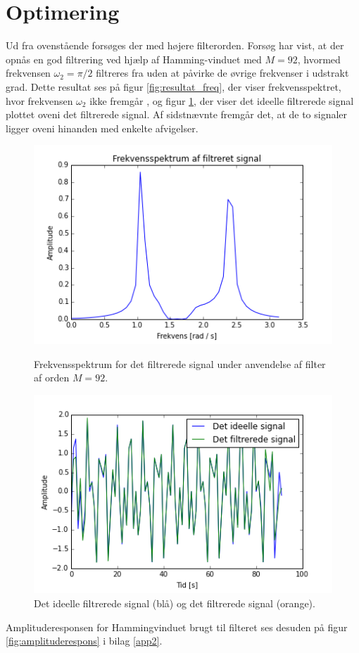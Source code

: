 \section{Optimering}
Ud fra ovenstående forsøges der med højere filterorden. Forsøg har vist, at der opnås en god filtrering ved hjælp af Hamming-vinduet med $M=92$, hvormed frekvensen $\omega_2 = \pi/2$ filtreres fra uden at påvirke de øvrige frekvenser i udstrakt grad. Dette resultat ses på figur \ref{fig:resultat_freq}, der viser frekvensspektret, hvor frekvensen $\omega_2$ ikke fremgår , og figur \ref{fig:resultat_signal}, der viser det ideelle filtrerede signal plottet oveni det filtrerede signal. Af sidstnævnte fremgår det, at de to signaler ligger oveni hinanden med enkelte afvigelser.
\begin{figure}[H]
\begin{minipage}{0.49\textwidth}
\centering
\includegraphics[width=\textwidth]{figures/Filter/freq_filt_signal.png}
\caption{Frekvensspektrum for det filtrerede signal under anvendelse af filter af orden $M=92$.}
\label{fig:resultat_freq}
\end{minipage}
\begin{minipage}{0.49\textwidth}
\centering
\includegraphics[width=\textwidth]{figures/Filter/signal_compare.png}
\caption{Det ideelle filtrerede signal (blå) og det filtrerede signal (orange).}
\label{fig:resultat_signal}
\end{minipage}
\end{figure}

Amplituderesponsen for Hammingvinduet brugt til filteret ses desuden på figur \ref{fig:amplituderespons} i bilag \ref{app2}.